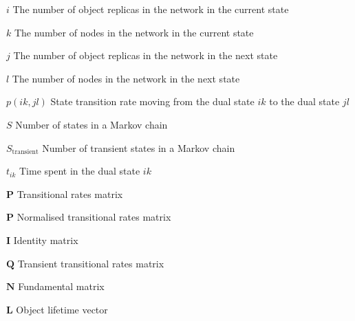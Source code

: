 \begin{Nomencl}[\gnat]
        \item[$i$]                      The number of object replicas in the network in the current state
        \item[$k$]                      The number of nodes in the network in the current state
        \item[$j$]                      The number of object replicas in the network in the next state
        \item[$l$]                      The number of nodes in the network in the next state
        \item[$p(ik, jl)$]              State transition rate moving from the dual state $ik$ to the dual state $jl$
        \item[$S$]                      Number of states in a Markov chain
        \item[$S_\textrm{transient}$]   Number of transient states in a Markov chain
        \item[$t_{ik}$]                 Time spent in the dual state $ik$
        \item[$\textbf{P}$]             Transitional rates matrix
        \item[$\textbf{\^{P}}$]         Normalised transitional rates matrix
        \item[$\textbf{I}$]             Identity matrix
        \item[$\textbf{Q}$]             Transient transitional rates matrix
        \item[$\textbf{N}$]             Fundamental matrix
        \item[$\textbf{L}$]             Object lifetime vector
        

\end{Nomencl}
